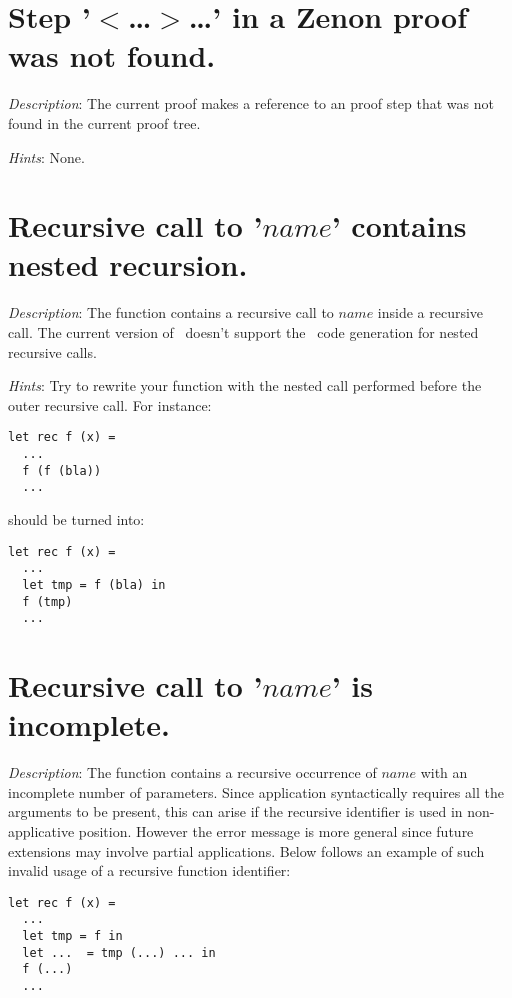 \section*{Step '$<$\ldots$>$\ldots' in a Zenon proof was not found.}

{\em Description}: The current proof makes a reference to an
proof step that was not found in the current proof tree.

{\em Hints}: None.


\section*{Recursive call to '$name$' contains nested recursion.}

{\em Description}: The function contains a recursive call to $name$
inside a recursive call. The current version of \focal\ doesn't
support the \coq\ code generation for nested recursive calls.

{\em Hints}: Try to rewrite your function with the nested call
performed before the outer recursive call. For instance:
{\scriptsize
\begin{lstlisting}
let rec f (x) =
  ...
  f (f (bla))
  ...
\end{lstlisting}
}
should be turned into:
{\scriptsize
\begin{lstlisting}
let rec f (x) =
  ...
  let tmp = f (bla) in
  f (tmp)
  ...
\end{lstlisting}
}



\section*{Recursive call to '$name$' is incomplete.}

{\em Description}: The function contains a recursive occurrence of
$name$ with an incomplete number of parameters. Since application
syntactically requires all the arguments to be present, this can arise
if the recursive identifier is used in non-applicative
position. However the error message is more general since future
extensions may involve partial applications. Below follows an example
of such invalid usage of a recursive function identifier:
{\scriptsize
\begin{lstlisting}
let rec f (x) =
  ...
  let tmp = f in
  let ...  = tmp (...) ... in
  f (...)
  ...
\end{lstlisting}
}

